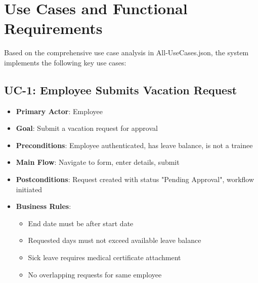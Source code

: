 \documentclass[12pt,a4paper]{article}
\begin{document}
\section{Use Cases and Functional Requirements}

Based on the comprehensive use case analysis in All-UseCases.json, the system implements the following key use cases:

\subsection{UC-1: Employee Submits Vacation Request}
\begin{itemize}
    \item \textbf{Primary Actor}: Employee
    \item \textbf{Goal}: Submit a vacation request for approval
    \item \textbf{Preconditions}: Employee authenticated, has leave balance, is not a trainee
    \item \textbf{Main Flow}: Navigate to form, enter details, submit
    \item \textbf{Postconditions}: Request created with status "Pending Approval", workflow initiated
    \item \textbf{Business Rules}: 
    \begin{itemize}
        \item End date must be after start date
        \item Requested days must not exceed available leave balance
        \item Sick leave requires medical certificate attachment
        \item No overlapping requests for same employee
    \end{itemize}
\end{itemize}
\end{document}
